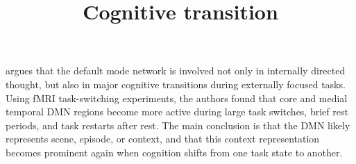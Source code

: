 \documentclass[a4paper]{article}
\title{Cognitive transition}
\date{}
\begin{document}
    \maketitle
    \cite{smith-2018-role-of-the-default-mode-network-in-cognitive-transitions} argues that the default mode network is involved not only in internally directed thought, but also in major cognitive transitions during externally focused tasks.
    Using fMRI task-switching experiments, the authors found that core and medial temporal DMN regions become more active during large task switches, brief rest periods, and task restarts after rest.
    The main conclusion is that the DMN likely represents scene, episode, or context, and that this context representation becomes prominent again when cognition shifts from one task state to another.
    
    
\end{document}
